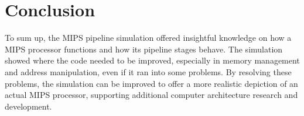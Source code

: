 \documentclass{article}
\begin{document}
\section{Conclusion}

To sum up, the MIPS pipeline simulation offered insightful knowledge on how a MIPS processor functions and how its pipeline stages behave. The simulation showed where the code needed to be improved, especially in memory management and address manipulation, even if it ran into some problems. By resolving these problems, the simulation can be improved to offer a more realistic depiction of an actual MIPS processor, supporting additional computer architecture research and development.
\end{document}
